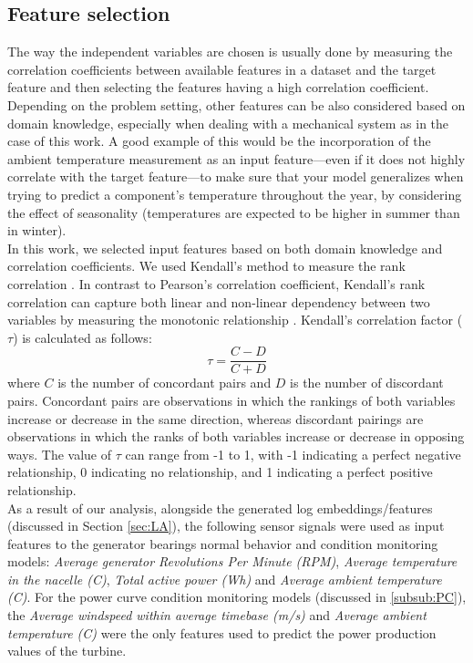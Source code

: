   \subsection{Feature selection}
  \label{sub:featselect}
    The way the independent variables are chosen is usually done by measuring the correlation coefficients between available features in a
    dataset and the target feature and then selecting the features having a high correlation coefficient. Depending on the problem setting, other features can be also considered 
    based on domain knowledge, especially when dealing with a mechanical system as in the case of this work. A good example of this would be the incorporation of 
    the ambient temperature measurement as an input feature---even if it does not highly correlate with the target feature---to make sure that your model generalizes when 
    trying to predict a component's temperature throughout the year, by considering the effect of seasonality 
    (temperatures are expected to be higher in summer than in winter).\\
    In this work, we selected input features based on both domain knowledge and correlation coefficients. We used Kendall's method to measure the rank correlation \cite{Kendall}.
    In contrast to Pearson's correlation coefficient, Kendall's rank correlation can capture both linear and non-linear dependency between two variables by 
    measuring the monotonic relationship \cite{corr_comp}. Kendall's correlation factor ($\tau$) is calculated as follows:
    \begin{equation}
      \tau = \frac{C-D}{C+D}
    \end{equation}
    where $C$ is the number of concordant pairs and $D$ is the number of discordant pairs. Concordant pairs are observations in which the rankings of both variables increase or 
    decrease in the same direction, whereas discordant pairings are observations in which the ranks of both variables increase or decrease in opposing ways.
    The value of $\tau$ can range from -1 to 1, with -1 indicating a perfect negative relationship, 0 indicating no relationship, and 1 indicating a perfect positive relationship.\\
    As a result of our analysis, alongside the generated log embeddings/features (discussed in Section \ref{sec:LA}), the following sensor signals were used as 
    input features to the generator bearings normal behavior and condition monitoring models: 
    \emph{Average generator Revolutions Per Minute (RPM)}, \emph{Average temperature in the nacelle (\degree C)}, \emph{Total active power (Wh)} and 
    \emph{Average ambient temperature (\degree C)}. For the power curve condition monitoring models (discussed in \ref{subsub:PC}), 
    the \emph{Average windspeed within average timebase (m/s)} and \emph{Average ambient temperature (\degree C)} were the only features used to predict the power production values of 
    the turbine.

